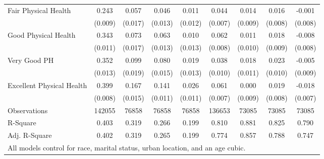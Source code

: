 \begin{table}
\begin{tabular}{l*{8}{c}}
Fair Physical Health&       0.243\sym{***}&       0.057\sym{***}&       0.046\sym{***}&       0.011         &       0.044\sym{***}&       0.014         &       0.016         &      -0.001         \\
                    &     (0.009)         &     (0.017)         &     (0.013)         &     (0.012)         &     (0.007)         &     (0.009)         &     (0.008)         &     (0.008)         \\
Good Physical Health&       0.343\sym{***}&       0.073\sym{***}&       0.063\sym{***}&       0.010         &       0.062\sym{***}&       0.011         &       0.018\sym{*}  &      -0.008         \\
                    &     (0.011)         &     (0.017)         &     (0.013)         &     (0.013)         &     (0.008)         &     (0.010)         &     (0.009)         &     (0.008)         \\
Very Good PH        &       0.352\sym{***}&       0.099\sym{***}&       0.080\sym{***}&       0.019         &       0.038\sym{***}&       0.018         &       0.023\sym{*}  &      -0.005         \\
                    &     (0.013)         &     (0.019)         &     (0.015)         &     (0.013)         &     (0.010)         &     (0.011)         &     (0.010)         &     (0.009)         \\
Excellent Physical Health&       0.399\sym{***}&       0.167\sym{***}&       0.141\sym{***}&       0.026\sym{*}  &       0.061\sym{***}&       0.000         &       0.019\sym{*}  &      -0.018\sym{*}  \\
                    &     (0.008)         &     (0.015)         &     (0.011)         &     (0.011)         &     (0.007)         &     (0.009)         &     (0.008)         &     (0.007)         \\
\midrule
Observations        &      142055         &       76858         &       76858         &       76858         &      136653         &       73085         &       73085         &       73085         \\
R-Square            &       0.403         &       0.319         &       0.266         &       0.199         &       0.810         &       0.881         &       0.825         &       0.790         \\
Adj. R-Square       &       0.402         &       0.319         &       0.265         &       0.199         &       0.774         &       0.857         &       0.788         &       0.747         \\
\bottomrule
\multicolumn{9}{l}{\small{All models control for race, marital status, urban location, and an age cubic.}} \\
\end{tabular}
\end{table}
